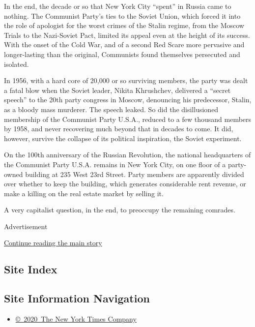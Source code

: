 In the end, the decade or so that New York City ``spent'' in Russia came
to nothing. The Communist Party's ties to the Soviet Union, which forced
it into the role of apologist for the worst crimes of the Stalin regime,
from the Moscow Trials to the Nazi-Soviet Pact, limited its appeal even
at the height of its success. With the onset of the Cold War, and of a
second Red Scare more pervasive and longer-lasting than the original,
Communists found themselves persecuted and isolated.

In 1956, with a hard core of 20,000 or so surviving members, the party
was dealt a fatal blow when the Soviet leader, Nikita Khrushchev,
delivered a ``secret speech'' to the 20th party congress in Moscow,
denouncing his predecessor, Stalin, as a bloody mass murderer. The
speech leaked. So did the disillusioned membership of the Communist
Party U.S.A., reduced to a few thousand members by 1958, and never
recovering much beyond that in decades to come. It did, however, survive
the collapse of its political inspiration, the Soviet experiment.

On the 100th anniversary of the Russian Revolution, the national
headquarters of the Communist Party U.S.A. remains in New York City, on
one floor of a party-owned building at 235 West 23rd Street. Party
members are apparently divided over whether to keep the building, which
generates considerable rent revenue, or make a killing on the real
estate market by selling it.

A very capitalist question, in the end, to preoccupy the remaining
comrades.

Advertisement

\protect\hyperlink{after-bottom}{Continue reading the main story}

\hypertarget{site-index}{%
\subsection{Site Index}\label{site-index}}

\hypertarget{site-information-navigation}{%
\subsection{Site Information
Navigation}\label{site-information-navigation}}

\begin{itemize}
\tightlist
\item
  \href{https://help.nytimes3xbfgragh.onion/hc/en-us/articles/115014792127-Copyright-notice}{©~2020~The
  New York Times Company}
\end{itemize}

